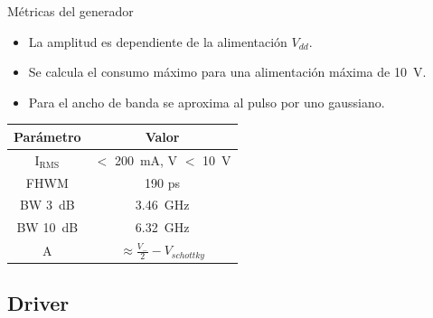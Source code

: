 \documentclass{beamer}
\begin{document}
\begin{frame}{Métricas del generador}

    \begin{block}{}
        \begin{itemize}
            \item La amplitud es dependiente de la alimentación $V_{dd}$.
            \item Se calcula el consumo máximo para una alimentación máxima de
                \qty{10}{\volt}.
            \item Para el ancho de banda se aproxima al pulso por uno gaussiano.
        \end{itemize}
    \end{block}

    \begin{table}
    \centering
        \begin{tabular}{c|c}
        \textbf{Parámetro} & \textbf{Valor} \\
        \hline
        $\text{I}_{\text{RMS}}$ & $<$ \qty{200}{\milli\ampere}, V $<$
            \qty{10}{\volt} \\
        FHWM & 190 ps \\
        BW \qty{3}{\dB} & \qty{3.46}{\giga\hertz} \\
        BW \qty{10}{\dB} & \qty{6.32}{\giga\hertz} \\
        A & \(\approx \frac{V_-}{2} - V_{schottky}\) \\
        \end{tabular}
    \end{table}

\end{frame}

\subsection{Driver}
\end{document}
